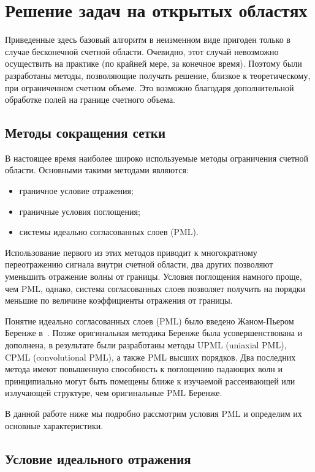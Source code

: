 

\section{Решение задач на открытых областях}
\label{section:GridReduction}

Приведенные здесь базовый алгоритм в неизменном виде пригоден только в случае
бесконечной счетной области. Очевидно, этот случай невозможно осуществить на
практике (по крайней мере, за конечное время). Поэтому были разработаны методы,
позволяющие получать решение, близкое к теоретическому, при ограниченном счетном
объеме. Это возможно благодаря дополнительной обработке полей на границе
счетного объема.


\subsection{Методы сокращения сетки}

В настоящее время наиболее широко используемые методы ограничения счетной
области. Основными такими методами являются:
\begin{itemize}
    \item граничное условие отражения;
	\item граничные условия поглощения;
	\item системы идеально согласованных слоев (PML).
\end{itemize}

Использование первого из этих методов приводит к многократному переотражению
сигнала внутри счетной области, два других позволяют уменьшить отражение волны
от границы. Условия поглощения намного проще, чем PML, однако, система
согласованных слоев позволяет получить на порядки меньшие по величине
коэффициенты отражения от границы.

Понятие идеально согласованных слоев (PML) было введено Жаном-Пьером Беренже
в~\cite{bib:Berenger1994}. Позже оригинальная методика Беренже была
усовершенствована и дополнена, в результате были разработаны методы
UPML (uniaxial PML), CPML (convolutional PML), а также PML высших порядков.
Два последних метода имеют повышенную способность к поглощению падающих волн
и принципиально могут быть помещены ближе к изучаемой рассеивающей или
излучающей структуре, чем оригинальные PML Беренже.

В данной работе ниже мы подробно рассмотрим условия PML и определим их основные
характеристики.


\subsection{Условие идеального отражения}


